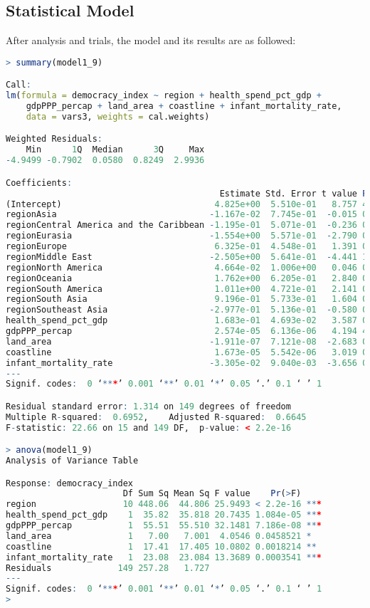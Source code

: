 \subsection{Statistical Model}
After analysis and trials, the model and its results are as followed:
\begin{lstlisting}[language=R, caption=Result of the model]
> summary(model1_9)

Call:
lm(formula = democracy_index ~ region + health_spend_pct_gdp + 
    gdpPPP_percap + land_area + coastline + infant_mortality_rate, 
    data = vars3, weights = cal.weights)

Weighted Residuals:
    Min      1Q  Median      3Q     Max 
-4.9499 -0.7902  0.0580  0.8249  2.9936 

Coefficients:
                                          Estimate Std. Error t value Pr(>|t|)    
(Intercept)                              4.825e+00  5.510e-01   8.757 4.07e-15 ***
regionAsia                              -1.167e-02  7.745e-01  -0.015 0.988000    
regionCentral America and the Caribbean -1.195e-01  5.071e-01  -0.236 0.814031    
regionEurasia                           -1.554e+00  5.571e-01  -2.790 0.005962 ** 
regionEurope                             6.325e-01  4.548e-01   1.391 0.166372    
regionMiddle East                       -2.505e+00  5.641e-01  -4.441 1.74e-05 ***
regionNorth America                      4.664e-02  1.006e+00   0.046 0.963073    
regionOceania                            1.762e+00  6.205e-01   2.840 0.005149 ** 
regionSouth America                      1.011e+00  4.721e-01   2.141 0.033931 *  
regionSouth Asia                         9.196e-01  5.733e-01   1.604 0.110819    
regionSoutheast Asia                    -2.977e-01  5.136e-01  -0.580 0.563116    
health_spend_pct_gdp                     1.683e-01  4.693e-02   3.587 0.000453 ***
gdpPPP_percap                            2.574e-05  6.136e-06   4.194 4.68e-05 ***
land_area                               -1.911e-07  7.121e-08  -2.683 0.008118 ** 
coastline                                1.673e-05  5.542e-06   3.019 0.002981 ** 
infant_mortality_rate                   -3.305e-02  9.040e-03  -3.656 0.000354 ***
---
Signif. codes:  0 ‘***’ 0.001 ‘**’ 0.01 ‘*’ 0.05 ‘.’ 0.1 ‘ ’ 1

Residual standard error: 1.314 on 149 degrees of freedom
Multiple R-squared:  0.6952,	Adjusted R-squared:  0.6645 
F-statistic: 22.66 on 15 and 149 DF,  p-value: < 2.2e-16

> anova(model1_9)
Analysis of Variance Table

Response: democracy_index
                       Df Sum Sq Mean Sq F value    Pr(>F)    
region                 10 448.06  44.806 25.9493 < 2.2e-16 ***
health_spend_pct_gdp    1  35.82  35.818 20.7435 1.084e-05 ***
gdpPPP_percap           1  55.51  55.510 32.1481 7.186e-08 ***
land_area               1   7.00   7.001  4.0546 0.0458521 *  
coastline               1  17.41  17.405 10.0802 0.0018214 ** 
infant_mortality_rate   1  23.08  23.084 13.3689 0.0003541 ***
Residuals             149 257.28   1.727                      
---
Signif. codes:  0 ‘***’ 0.001 ‘**’ 0.01 ‘*’ 0.05 ‘.’ 0.1 ‘ ’ 1
> 
\end{lstlisting}

